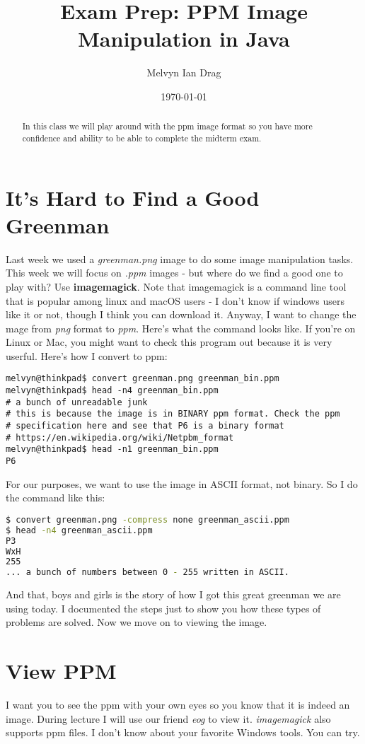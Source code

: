 \documentclass[12pt]{article}
\title{Exam Prep: PPM Image Manipulation in Java}
\author{
	Melvyn Ian Drag
}
\date{\today}
\begin{document}
\maketitle

\begin{abstract}
In this class we will play around with the ppm image format so you have more confidence and ability to be able to complete the midterm exam.
\end{abstract}


\section{It's Hard to Find a Good Greenman}
Last week we used a \textit{greenman.png} image to do some image manipulation tasks. This week we will focus on \textit{.ppm} images - but where do we find a good one to play with? Use \textbf{imagemagick}. Note that imagemagick is a command line tool that is popular among linux and macOS users - I don't know if windows users like it or not, though I think you can download it. Anyway, I want to change the 
mage from \textit{png} format to \textit{ppm}. Here's what the command looks like. If you're on Linux or Mac, you might want to check this program out because it is very userful. Here's how I convert to ppm:

\begin{lstlisting}
melvyn@thinkpad$ convert greenman.png greenman_bin.ppm
melvyn@thinkpad$ head -n4 greenman_bin.ppm
# a bunch of unreadable junk
# this is because the image is in BINARY ppm format. Check the ppm
# specification here and see that P6 is a binary format
# https://en.wikipedia.org/wiki/Netpbm_format
melvyn@thinkpad$ head -n1 greenman_bin.ppm
P6
\end{lstlisting}

For our purposes, we want to use the image in ASCII format, not binary. So I do the command like this:

\begin{lstlisting}[language=bash]
$ convert greenman.png -compress none greenman_ascii.ppm
$ head -n4 greenman_ascii.ppm
P3
WxH
255
... a bunch of numbers between 0 - 255 written in ASCII.
\end{lstlisting}

And that, boys and girls is the story of how I got this great greenman we are using today. I documented the steps just to show you how these types of problems are solved. Now we move on to viewing the image.

\section{View PPM}
I want you to see the ppm with your own eyes so you know that it is indeed an image. During lecture I will use our friend \textit{eog} to view it. \textit{imagemagick} also supports ppm files. I don't know about your favorite Windows tools. You can try. 
\end{document}
